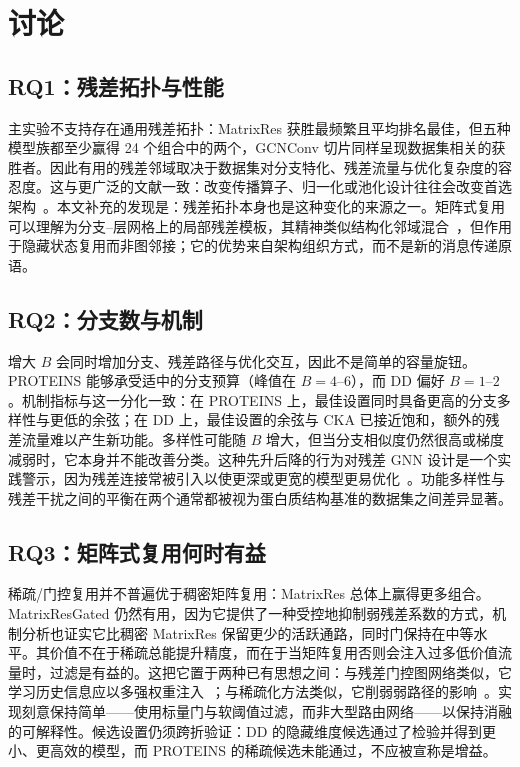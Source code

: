 \documentclass[9pt,twocolumn]{extarticle}
\begin{document}
\section{讨论}
\label{sec:discussion-zh}

\subsection{RQ1：残差拓扑与性能}

主实验不支持存在通用残差拓扑：MatrixRes 获胜最频繁且平均排名最佳，但五种模型族都至少赢得 24 个组合中的两个，GCNConv 切片同样呈现数据集相关的获胜者。因此有用的残差邻域取决于数据集对分支特化、残差流量与优化复杂度的容忍度。这与更广泛的文献一致：改变传播算子、归一化或池化设计往往会改变首选架构~\cite{xu2019gin,hamilton2017inductive,ying2018hierarchical}。本文补充的发现是：残差拓扑本身也是这种变化的来源之一。矩阵式复用可以理解为分支--层网格上的局部残差模板，其精神类似结构化邻域混合~\cite{abu2019mixhop}，但作用于隐藏状态复用而非图邻接；它的优势来自架构组织方式，而不是新的消息传递原语。

\subsection{RQ2：分支数与机制}

增大 \(B\) 会同时增加分支、残差路径与优化交互，因此不是简单的容量旋钮。PROTEINS 能够承受适中的分支预算（峰值在 \(B=4\)--\(6\)），而 DD 偏好 \(B=1\)--\(2\)。机制指标与这一分化一致：在 PROTEINS 上，最佳设置同时具备更高的分支多样性与更低的余弦；在 DD 上，最佳设置的余弦与 CKA 已接近饱和，额外的残差流量难以产生新功能。多样性可能随 \(B\) 增大，但当分支相似度仍然很高或梯度减弱时，它本身并不能改善分类。这种先升后降的行为对残差 GNN 设计是一个实践警示，因为残差连接常被引入以使更深或更宽的模型更易优化~\cite{he2016deep}。功能多样性与残差干扰之间的平衡在两个通常都被视为蛋白质结构基准的数据集之间差异显著。

\subsection{RQ3：矩阵式复用何时有益}

稀疏/门控复用并不普遍优于稠密矩阵复用：MatrixRes 总体上赢得更多组合。MatrixResGated 仍然有用，因为它提供了一种受控地抑制弱残差系数的方式，机制分析也证实它比稠密 MatrixRes 保留更少的活跃通路，同时门保持在中等水平。其价值不在于稀疏总能提升精度，而在于当矩阵复用否则会注入过多低价值流量时，过滤是有益的。这把它置于两种已有思想之间：与残差门控图网络类似，它学习历史信息应以多强权重注入~\cite{bresson2017residual}；与稀疏化方法类似，它削弱弱路径的影响~\cite{rong2019dropedge}。实现刻意保持简单——使用标量门与软阈值过滤，而非大型路由网络——以保持消融的可解释性。候选设置仍须跨折验证：DD 的隐藏维度候选通过了检验并得到更小、更高效的模型，而 PROTEINS 的稀疏候选未能通过，不应被宣称是增益。
\end{document}
